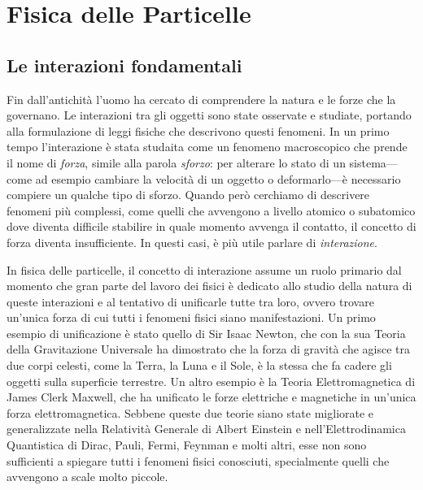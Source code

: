 \chapter{Fisica delle Particelle}
    \section{Le interazioni fondamentali}
        Fin dall'antichità l'uomo ha cercato di comprendere la natura e le forze che la governano. Le interazioni tra gli oggetti sono state osservate e studiate, portando alla formulazione di leggi fisiche che descrivono questi fenomeni. In un primo tempo l'interazione è stata studaita come un fenomeno macroscopico che prende il nome di \emph{forza}, simile alla parola \emph{sforzo}: per alterare lo stato di un sistema---come ad esempio cambiare la velocità di un oggetto o deformarlo---è necessario compiere un qualche tipo di sforzo. Quando però cerchiamo di descrivere fenomeni più complessi, come quelli che avvengono a livello atomico o subatomico dove diventa difficile stabilire in quale momento avvenga il contatto, il concetto di forza diventa insufficiente. In questi casi, è più utile parlare di \emph{interazione}.
        
        In fisica delle particelle, il concetto di interazione assume un ruolo primario dal momento che gran parte del lavoro dei fisici è dedicato allo studio della natura di queste interazioni e al tentativo di unificarle tutte tra loro, ovvero trovare un'unica forza di cui tutti i fenomeni fisici siano manifestazioni. Un primo esempio di unificazione è stato quello di Sir Isaac Newton, che con la sua Teoria della Gravitazione Universale ha dimostrato che la forza di gravità che agisce tra due corpi celesti, come la Terra, la Luna e il Sole, è la stessa che fa cadere gli oggetti sulla superficie terrestre. Un altro esempio è la Teoria Elettromagnetica di James Clerk Maxwell, che ha unificato le forze elettriche e magnetiche in un'unica forza elettromagnetica. Sebbene queste due teorie siano state migliorate e generalizzate nella Relatività Generale di Albert Einstein e nell'Elettrodinamica Quantistica di Dirac, Pauli, Fermi, Feynman e molti altri, esse non sono sufficienti a spiegare tutti i fenomeni fisici conosciuti, specialmente quelli che avvengono a scale molto piccole.

